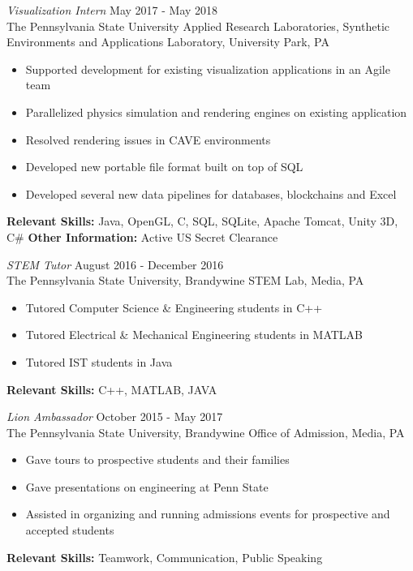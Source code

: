 \documentclass[line,margin]{res}
\begin{document}
\begin{resume}
		{\sl Visualization Intern} \hfill May 2017 - May 2018 \\
		The Pennsylvania State University Applied Research Laboratories, Synthetic Environments and Applications Laboratory, University Park, PA
		\begin{itemize}  \itemsep -2pt
			\item Supported development for existing visualization applications in an Agile team
			\item Parallelized physics simulation and rendering engines on existing application
			\item Resolved rendering issues in CAVE environments
			\item Developed new portable file format built on top of SQL
			\item Developed several new data pipelines for databases, blockchains and Excel
			\vspace*{-\baselineskip}		
		\end{itemize}
		\textbf{Relevant Skills:} Java, OpenGL, C, SQL, SQLite, Apache Tomcat, Unity 3D, C\#
		\textbf{Other Information:} Active US Secret Clearance
		\newline
		
		{\sl STEM Tutor} \hfill August 2016 - December 2016 \\
		The Pennsylvania State University, Brandywine STEM Lab, Media, PA
		\begin{itemize}  \itemsep -2pt
			\item Tutored Computer Science \& Engineering students in C++
			\item Tutored Electrical \& Mechanical Engineering students in MATLAB
			\item Tutored IST students in Java
			\vspace*{-\baselineskip}		
		\end{itemize}
		\textbf{Relevant Skills:} C++, MATLAB, JAVA
		\newline
		
		{\sl Lion Ambassador} \hfill October 2015 - May 2017 \\
		The Pennsylvania State University, Brandywine Office of Admission, Media, PA
		\begin{itemize}  \itemsep -2pt
			\item Gave tours to prospective students and their families
			\item Gave presentations on engineering at Penn State
			\item Assisted in organizing and running admissions events for prospective and accepted students
			\vspace*{-\baselineskip}		
		\end{itemize}
		\textbf{Relevant Skills:} Teamwork, Communication, Public Speaking
		\newline
			

\end{resume}
\end{document}
